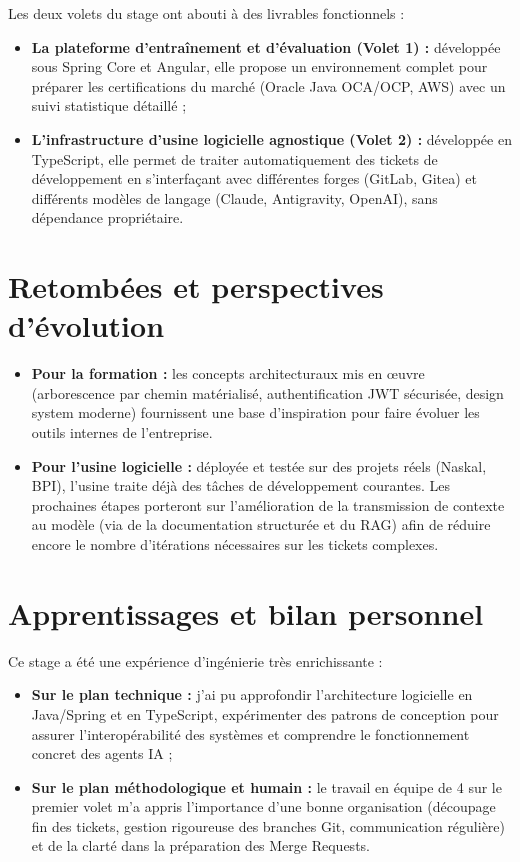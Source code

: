 \documentclass{tnreport}
\begin{document}
Les deux volets du stage ont abouti à des livrables fonctionnels :
\begin{itemize}
    \item \textbf{La plateforme d'entraînement et d'évaluation (Volet 1) :} développée sous Spring Core et Angular, elle propose un environnement complet pour préparer les certifications du marché (Oracle Java OCA/OCP, AWS) avec un suivi statistique détaillé ;
    \item \textbf{L'infrastructure d'usine logicielle agnostique (Volet 2) :} développée en TypeScript, elle permet de traiter automatiquement des tickets de développement en s'interfaçant avec différentes forges (GitLab, Gitea) et différents modèles de langage (Claude, Antigravity, OpenAI), sans dépendance propriétaire.
\end{itemize}

\section*{Retombées et perspectives d'évolution}

\begin{itemize}
    \item \textbf{Pour la formation :} les concepts architecturaux mis en œuvre (arborescence par chemin matérialisé, authentification JWT sécurisée, design system moderne) fournissent une base d'inspiration pour faire évoluer les outils internes de l'entreprise.
    \item \textbf{Pour l'usine logicielle :} déployée et testée sur des projets réels (Naskal, BPI), l'usine traite déjà des tâches de développement courantes. Les prochaines étapes porteront sur l'amélioration de la transmission de contexte au modèle (via de la documentation structurée et du RAG) afin de réduire encore le nombre d'itérations nécessaires sur les tickets complexes.
\end{itemize}

\section*{Apprentissages et bilan personnel}

Ce stage a été une expérience d'ingénierie très enrichissante :
\begin{itemize}
    \item \textbf{Sur le plan technique :} j'ai pu approfondir l'architecture logicielle en Java/Spring et en TypeScript, expérimenter des patrons de conception pour assurer l'interopérabilité des systèmes et comprendre le fonctionnement concret des agents IA ;
    \item \textbf{Sur le plan méthodologique et humain :} le travail en équipe de 4 sur le premier volet m'a appris l'importance d'une bonne organisation (découpage fin des tickets, gestion rigoureuse des branches Git, communication régulière) et de la clarté dans la préparation des Merge Requests.
\end{itemize}
\end{document}
